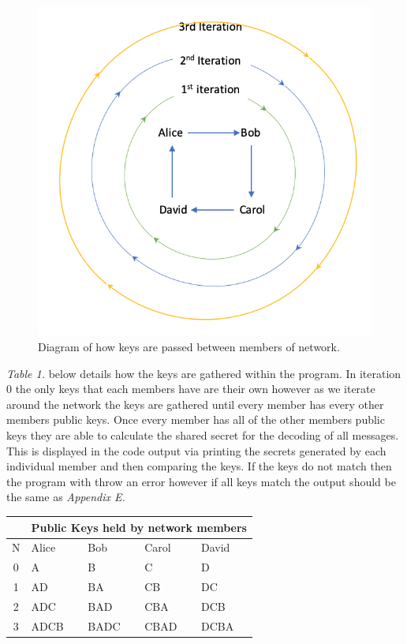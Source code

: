 \documentclass[a4paper, twoside, 11pt]{article}
\begin{document}
\begin{figure}[H]
	\centering
	\includegraphics[scale=0.8]{Images/KeyIteration.png}
  \caption{Diagram of how keys are passed between members of network.}
  \setlength{\belowcaptionskip}{0pt}
\end{figure}


\textit{Table 1.} below details how the keys are gathered within the program. In iteration 0 the only keys that each
members have are their own however as we iterate around the network the keys are gathered until every member
has every other members public keys. Once every member has all of the other members public keys they are able to calculate the shared secret for the decoding of all messages. This is displayed in the code output via printing the secrets generated by each individual member and then comparing the keys. If the keys do not match then the program with throw an error however if all keys match the output should be the same as \textit{Appendix E.}

\begin{center}
	\begin{tabular}{ |c|l|l|l|l| } 
	 \hline
	 \multicolumn{1}{|c|}{}& \multicolumn {4}{|c|}{Public Keys held by network members} \\
	 \hline
   N & Alice & Bob & Carol & David \\
   \hline
   0 & A & B & C & D \\
   1 & AD & BA & CB & DC \\
   2 & ADC & BAD & CBA & DCB \\
   3 & ADCB & BADC & CBAD & DCBA \\
	 \hline
	\end{tabular}
\end{center}
\end{document}

